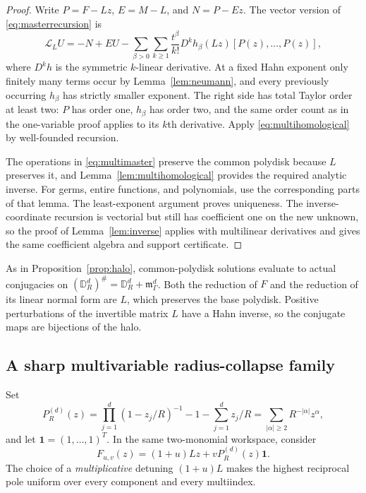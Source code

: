 \documentclass[11pt,a4paper]{article}
\numberwithin{equation}{section}
\theoremstyle{definition}
\theoremstyle{remark}
\newcommand{\mm}{\mathfrak m}
\newcommand{\LL}{\mathcal L}
\begin{document}
\begin{proof}
Write $P=F-Lz$, $E=M-L$, and $N=P-Ez$. The vector version of
\eqref{eq:masterrecursion} is
\begin{equation}\label{eq:multimaster}
 \LL_LU=-N+EU-
 \sum_{\beta>0}\sum_{k\ge1}\frac{t^\beta}{k!}
       D^kh_\beta(Lz)[P(z),\ldots,P(z)],
\end{equation}
where $D^kh$ is the symmetric $k$-linear derivative. At a fixed Hahn
exponent only finitely many terms occur by
Lemma~\ref{lem:neumann}, and every previously occurring $h_\beta$ has
strictly smaller exponent. The right side has total Taylor order at
least two: $P$ has order one, $h_\beta$ has order two, and the same
order count as in the one-variable proof applies to its $k$th derivative.
Apply \eqref{eq:multihomological} by well-founded recursion.

The operations in \eqref{eq:multimaster} preserve the common polydisk
because $L$ preserves it, and Lemma~\ref{lem:multihomological} provides
the required analytic inverse. For germs, entire functions, and
polynomials, use the corresponding parts of that lemma. The least-exponent
argument proves uniqueness. The inverse-coordinate recursion is vectorial
but still has coefficient one on the new unknown, so the proof of
Lemma~\ref{lem:inverse} applies with multilinear derivatives and gives
the same coefficient algebra and support certificate.
\end{proof}

As in Proposition~\ref{prop:halo}, common-polydisk solutions evaluate to
actual conjugacies on
$(\mathbb D_R^d)^\#=\mathbb D_R^d+\mm_\Gamma^d$. Both the reduction of
$F$ and the reduction of its linear normal form are $L$, which preserves
the base polydisk. Positive perturbations of the invertible matrix $L$
have a Hahn inverse, so the conjugate maps are bijections of the halo.

\subsection{A sharp multivariable radius-collapse family}

Set
\begin{equation}\label{eq:multiP}
 P_R^{(d)}(z)=
 \prod_{j=1}^d(1-z_j/R)^{-1}-1-\sum_{j=1}^d z_j/R
 =\sum_{|\alpha|\ge2}R^{-|\alpha|}z^\alpha,
\end{equation}
and let $\mathbf1=(1,\ldots,1)^T$. In the same two-monomial workspace,
consider
\begin{equation}\label{eq:multiF}
 F_{u,v}(z)=(1+u)Lz+vP_R^{(d)}(z)\mathbf1.
\end{equation}
The choice of a \emph{multiplicative} detuning $(1+u)L$ makes the highest
reciprocal pole uniform over every component and every multiindex.
\end{document}

